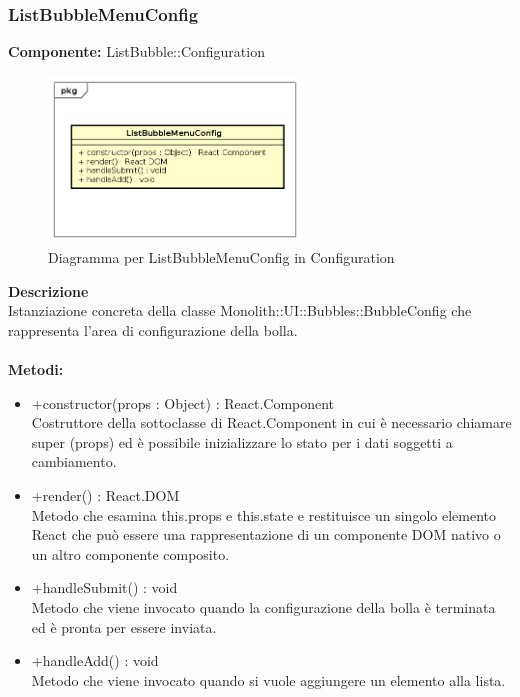 \subsubsection{ListBubbleMenuConfig}
\textbf{Componente:}  ListBubble::Configuration\\
   \FloatBarrier
   \begin{figure}[ht]
   \centering
   \includegraphics[width=0.6\textwidth]{img/single-ListBubbleMenuConfig}
   \caption{{Diagramma per ListBubbleMenuConfig in Configuration}}
\end{figure}
\FloatBarrier
\textbf{Descrizione}\\
Istanziazione concreta della classe Monolith::UI::Bubbles::BubbleConfig che rappresenta l'area di configurazione della bolla. 
\\
\\
\textbf{Metodi:} 
\begin{itemize}
\item +constructor(props : Object) : React.Component 
\\
Costruttore della sottoclasse di React.Component in cui è necessario chiamare super (props) ed è possibile inizializzare lo stato per i dati soggetti a cambiamento.

\item +render() : React.DOM 
\\
Metodo che esamina this.props e this.state e restituisce un singolo elemento React che può essere una rappresentazione di un componente DOM nativo o un altro componente composito.

\item +handleSubmit() : void 
\\
Metodo che viene invocato quando la configurazione della bolla è terminata ed è pronta per essere inviata.

\item +handleAdd() : void 
\\
Metodo che viene invocato quando si vuole aggiungere un elemento alla lista.
\end{itemize} 


